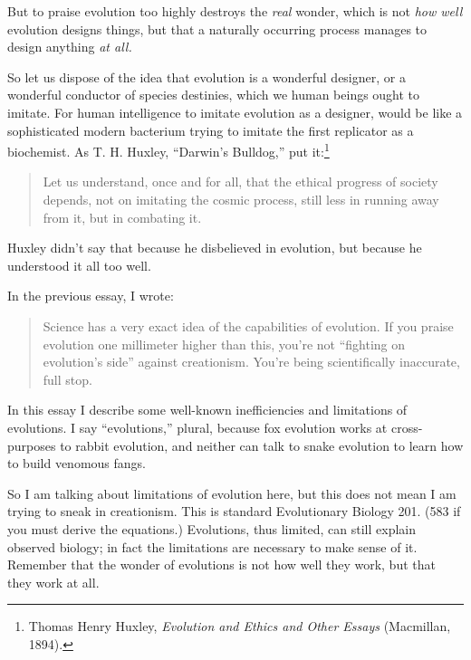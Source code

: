 {{
 But to praise evolution too highly destroys the \textit{real}
wonder, which is not \textit{how well} evolution designs things, but
that a naturally occurring process manages to design anything
\textit{at all.}}

{
 So let us dispose of the idea that evolution is a wonderful
designer, or a wonderful conductor of species destinies, which we human
beings ought to imitate. For human intelligence to imitate evolution as
a designer, would be like a sophisticated modern bacterium trying to
imitate the first replicator as a biochemist. As T. H. Huxley,
``Darwin's
Bulldog,'' put it:\footnote{Thomas Henry Huxley, \textit{Evolution and Ethics and Other
Essays} (Macmillan, 1894).}}

\begin{quote}
 Let us understand, once and for all, that the ethical progress of
society depends, not on imitating the cosmic process, still less in
running away from it, but in combating it.
\end{quote}

{
 Huxley didn't say that because he disbelieved in
evolution, but because he understood it all too well.}

\myendsectiontext


\bigskip


{
 In the previous essay, I wrote:}

\begin{quote}
{
 Science has a very exact idea of the capabilities of evolution. If
you praise evolution one millimeter higher than this,
you're not ``fighting on
evolution's side'' against
creationism. You're being scientifically inaccurate,
full stop.}
\end{quote}

{
 In this essay I describe some well-known inefficiencies and
limitations of evolutions. I say
``evolutions,'' plural, because fox
evolution works at cross-purposes to rabbit evolution, and neither can
talk to snake evolution to learn how to build venomous fangs.}

{
 So I am talking about limitations of evolution here, but this does
not mean I am trying to sneak in creationism. This is standard
Evolutionary Biology 201. (583 if you must derive the equations.)
Evolutions, thus limited, can still explain observed biology; in fact
the limitations are necessary to make sense of it. Remember that the
wonder of evolutions is not how well they work, but that they work at
all.}

}
